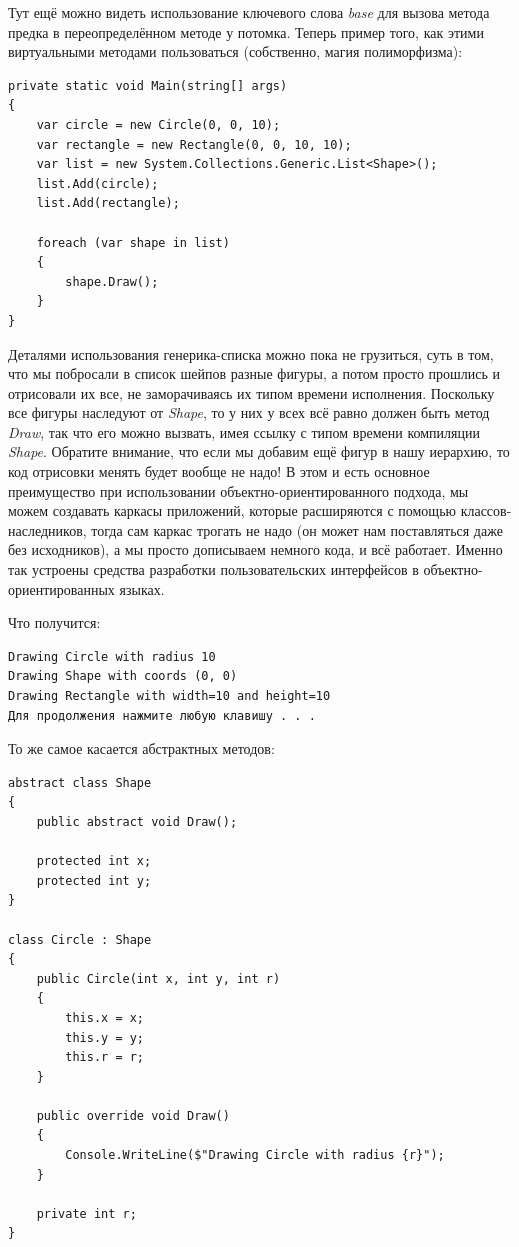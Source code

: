 \documentclass{../../text-style}
\begin{document}
Тут ещё можно видеть использование ключевого слова \textit{base} для вызова метода предка в переопределённом методе у потомка. Теперь пример того, как этими виртуальными методами пользоваться (собственно, магия полиморфизма):

\begin{verbatim}
private static void Main(string[] args)
{
    var circle = new Circle(0, 0, 10);
    var rectangle = new Rectangle(0, 0, 10, 10);
    var list = new System.Collections.Generic.List<Shape>();
    list.Add(circle);
    list.Add(rectangle);

    foreach (var shape in list)
    {
        shape.Draw();
    }
}
\end{verbatim}

Деталями использования генерика-списка можно пока не грузиться, суть в том, что мы побросали в список шейпов разные фигуры, а потом просто прошлись и отрисовали их все, не заморачиваясь их типом времени исполнения. Поскольку все фигуры наследуют от \textit{Shape}, то у них у всех всё равно должен быть метод \textit{Draw}, так что его можно вызвать, имея ссылку с типом времени компиляции \textit{Shape}. Обратите внимание, что если мы добавим ещё фигур в нашу иерархию, то код отрисовки менять будет вообще не надо! В этом и есть основное преимущество при использовании объектно-ориентированного подхода, мы можем создавать каркасы приложений, которые расширяются с помощью классов-наследников, тогда сам каркас трогать не надо (он может нам поставляться даже без исходников), а мы просто дописываем немного кода, и всё работает. Именно так устроены средства разработки пользовательских интерфейсов в объектно-ориентированных языках.

Что получится:

\begin{verbatim}
Drawing Circle with radius 10
Drawing Shape with coords (0, 0)
Drawing Rectangle with width=10 and height=10
Для продолжения нажмите любую клавишу . . .
\end{verbatim}

То же самое касается абстрактных методов:

\begin{verbatim}
abstract class Shape
{
    public abstract void Draw();

    protected int x;
    protected int y;
}

class Circle : Shape
{
    public Circle(int x, int y, int r)
    {
        this.x = x;
        this.y = y;
        this.r = r;
    }

    public override void Draw()
    {
        Console.WriteLine($"Drawing Circle with radius {r}");
    }

    private int r;
}
\end{verbatim}
\end{document}
